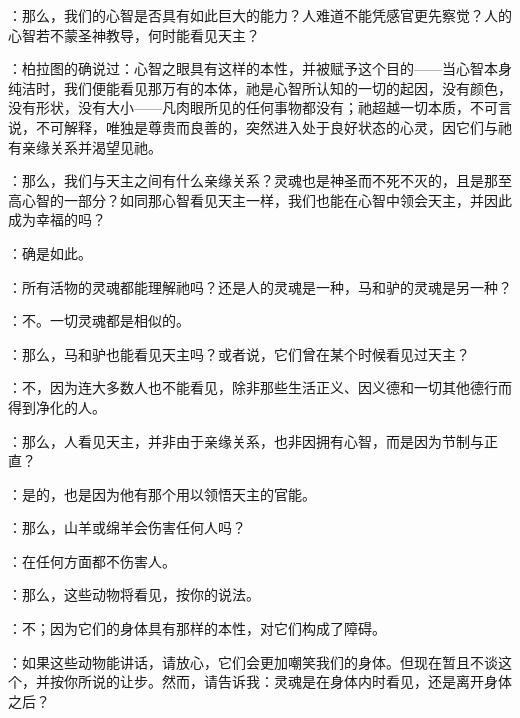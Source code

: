：那么，我们的心智是否具有如此巨大的能力？人难道不能凭感官更先察觉？人的心智若不蒙圣神教导，何时能看见天主？\par

：柏拉图的确说过：心智之眼具有这样的本性，并被赋予这个目的——当心智本身纯洁时，我们便能看见那万有的本体，祂是心智所认知的一切的起因，没有颜色，没有形状，没有大小——凡肉眼所见的任何事物都没有；祂超越一切本质，不可言说，不可解释，唯独是尊贵而良善的，突然进入处于良好状态的心灵，因它们与祂有亲缘关系并渴望见祂。\par

：那么，我们与天主之间有什么亲缘关系？灵魂也是神圣而不死不灭的，且是那至高心智的一部分？如同那心智看见天主一样，我们也能在心智中领会天主，并因此成为幸福的吗？\par

：确是如此。\par

：所有活物的灵魂都能理解祂吗？还是人的灵魂是一种，马和驴的灵魂是另一种？\par

：不。一切灵魂都是相似的。\par

：那么，马和驴也能看见天主吗？或者说，它们曾在某个时候看见过天主？\par

：不，因为连大多数人也不能看见，除非那些生活正义、因义德和一切其他德行而得到净化的人。\par

：那么，人看见天主，并非由于亲缘关系，也非因拥有心智，而是因为节制与正直？\par

：是的，也是因为他有那个用以领悟天主的官能。\par

：那么，山羊或绵羊会伤害任何人吗？\par

：在任何方面都不伤害人。\par

：那么，这些动物将看见，按你的说法。\par

：不；因为它们的身体具有那样的本性，对它们构成了障碍。\par

：如果这些动物能讲话，请放心，它们会更加嘲笑我们的身体。但现在暂且不谈这个，并按你所说的让步。然而，请告诉我：灵魂是在身体内时看见，还是离开身体之后？\par

